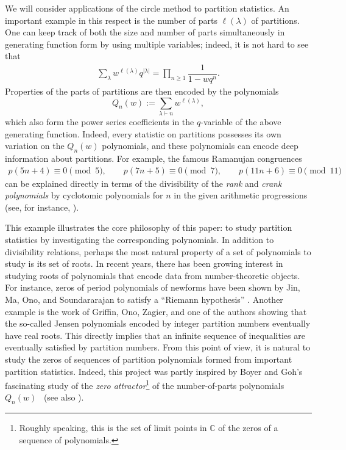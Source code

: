 \documentclass[pdftex]{sigma}
\numberwithin{equation}{section}
\def\lp{\left(}
\def\rp{\right)}
\begin{document}
We will consider applications of the circle method to partition statistics. An important example in this respect is the number of parts $\ell\lp \lambda \rp$ of partitions. One can keep track of both the size and number of parts simultaneously in generating function form by using multiple variables; indeed, it is not hard to see that
\begin{align*}
 \sum_{\lambda} w^{\ell\lp\lambda\rp} q^{|\lambda|} = \prod_{n \geq 1} \dfrac{1}{1 - w q^n}.
\end{align*}
Properties of the parts of partitions are then encoded by the polynomials
\begin{equation}\label{E:QnwDEF}Q_n(w) := \sum_{\lambda \vdash n} w^{\ell\lp\lambda\rp},\end{equation}
which also form the power series coefficients in the $q$-variable of the above generating function. Indeed, every statistic on partitions possesses its own variation on the $Q_n(w)$ polynomials, and these polynomials can encode deep information about partitions. For example, the famous Ramanujan congruences
\begin{align*}
 p(5n+4) \equiv 0 \pmod{5}, \qquad p(7n+5) \equiv 0 \pmod{7}, \qquad p(11n+6) \equiv 0 \pmod{11}
\end{align*}
can be explained directly in terms of the divisibility of the {\it rank} and {\it crank polynomials} by cyclotomic polynomials for $n$ in the given arithmetic progressions (see, for instance, \cite{AG,BGRT,Garvan}).

This example illustrates the core philosophy of this paper: to study partition statistics by investigating the corresponding polynomials. In addition to divisibility relations, perhaps the most natural property of a set of polynomials to study is its set of roots. In recent years, there has been growing interest in studying roots of polynomials that encode data from number-theoretic objects. For instance, zeros of period polynomials of newforms have been shown by Jin, Ma, Ono, and Soundararajan to satisfy a ``Riemann hypothesis'' \cite{JMOS}. Another example is the work of Griffin, Ono, Zagier, and one of the authors \cite{GORZ} showing that the so-called Jensen polynomials encoded by integer partition numbers eventually have real roots. This directly implies that an infinite sequence of inequalities are eventually satisfied by partition numbers.
 From this point of view, it is natural to study the zeros of sequences of partition polynomials formed from important partition statistics. Indeed, this project was partly inspired by Boyer and Goh's fascinating study of the {\it zero attractor}\footnote{Roughly speaking, this is the set of limit points in $\mathbb{C}$ of the zeros of a sequence of polynomials.} of the number-of-parts polynomials~$Q_n(w)$~\mbox{\cite{BG1,BG2}} (see also \cite{BoyerParry1, BoyerParry3,BoyerParry2,BoyerParry4,BFG,BFM,Parry}).
\end{document}
